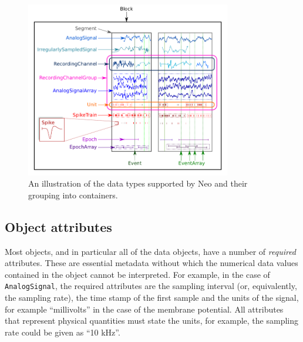 \documentclass{frontiers}
\begin{document}
\begin{figure}
\centering
\includegraphics[width=0.8\textwidth]{figures/base_schematic2_lowres}
\caption{An illustration of the data types supported by Neo and their grouping into containers.}\label{fig:overview} 
\end{figure}
%
%
%


\subsection{Object attributes}

Most objects, and in particular all of the data objects, have a number of \emph{required} attributes.
These are essential metadata without which the numerical data values contained in the object cannot be interpreted.
For example, in the case of \lstinline`AnalogSignal`, the required attributes are the sampling interval (or, equivalently, the sampling rate), the time stamp of the first sample and the units of the signal, for example ``millivolts'' in the case of the membrane potential. 
All attributes that represent physical quantities must state the units, for example, the sampling rate could be given as ``10 kHz''.
\end{document}
